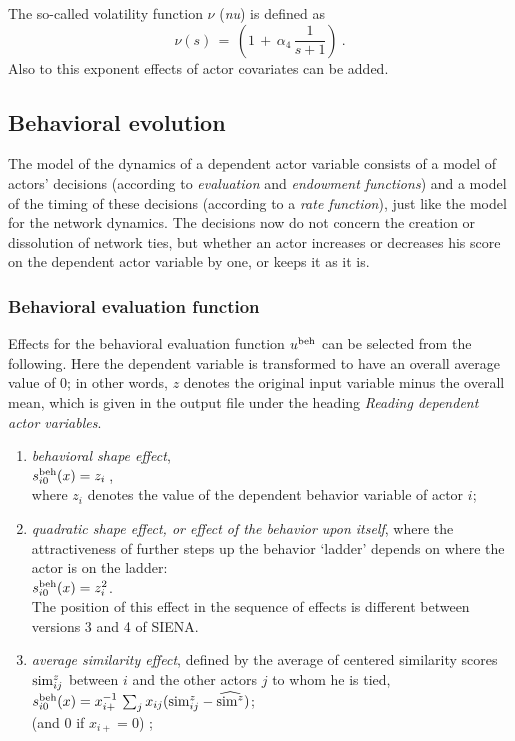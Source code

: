 \documentclass[a4paper,fleqn]{article}
\newcommand{\+}{\, + \,}
\newcommand{\vit}{\theenumi}
\newcommand{\si}{{\sf SIENA}}
\begin{document}
{The so-called volatility function $\nu$ (\emph{nu}) is defined as
\[ \nu(s) \,=\, \left( 1 \,+\, \alpha_4 \, \frac{1}{s+1} \right) \ . \]
Also to this exponent effects of actor covariates can be added.
\fi

\subsection{Behavioral evolution}
The model of the dynamics of a dependent actor variable
consists of a model of actors' decisions (according to {\it
evaluation} and {\it endowment functions}) and a model of the timing
of these decisions (according to a {\it rate function}),
just like the model for the network dynamics. The
decisions now do not concern the creation or dissolution of
network ties, but whether an actor increases or decreases his
score on the dependent actor variable by one, or keeps it as it
is.

\subsubsection{Behavioral evaluation function}
\label{S_f_b}

Effects for the behavioral evaluation function $u^{\rm beh}$ can be
selected from the following.
Here the dependent variable is transformed to have an overall average value of 0;
in other words, $z$ denotes the original input variable
minus the overall mean, which is given in the output file under the heading
\emph{Reading dependent actor variables}.

\begin{enumerate}
 \item {\em behavioral shape effect},\\
 $s^{\rm beh}_{i\vit}(x) = z_i \,$,\\
 where $z_{i}$ denotes the value of the dependent behavior variable of actor $i$;

 \item {\em quadratic shape effect, or effect of the behavior upon itself},
 where the attractiveness of further steps up the behavior `ladder'
 depends on where the actor is on the ladder:\\
 $s^{\rm beh}_{i\vit}(x) =  z_i^2$.\\
 The position of this effect in the sequence of effects is different between
 versions 3 and 4 of \si.


 \item {\em average similarity effect}, defined by the
 average of centered similarity scores ${\rm sim}^z_{ij}$ between $i$
 and the other actors $j$ to whom he is tied,\\
 $s^{\rm beh}_{i\vit}(x) = x_{i+}^{-1} \, \sum_j x_{ij} ({\rm sim}^z_{ij} - \widehat{{\rm sim}^z}) $;\\
 (and 0 if $x_{i+} = 0$) ;


\end{enumerate}}
\end{document}
